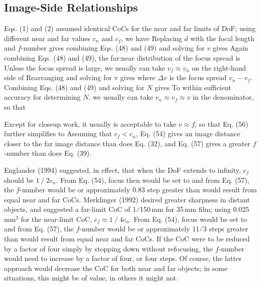 \documentclass[11pt, oneside]{scrartcl}   	%
\begin{document}
\subsection{Image-Side Relationships}

Eqs. (1) and (2) assumed identical CoCs for the near and far limits of DoF; using different near and far values $c_n$ and $c_f$, we have
Replacing $d$ with the focal length and $f$-number gives
combining Eqs. (48) and (49) and solving for $v$ gives
Again combining Eqs. (48) and (49), the far:near distribution of the focus spread is
Unless the focus spread is large, we usually can take $v_f \approx v_n$ on the right-hand side of
Rearranging and solving for v gives
where $Δv$ is the focus spread $v_n - v_f$. Combining Eqs. (48) and (49) and solving for $N$ gives
To within sufficient accuracy for determining $N$, we usually can take $v_n \approx v_f \approx v$ in the denominator, so that

Except for closeup work, it usually is acceptable to take $v \approx f$, so that Eq. (56) further simplifies to
Assuming that $c_f < c_n$, Eq. (54) gives an image distance closer to the far image distance than does Eq. (32), and Eq. (57) gives a greater $f$-number than does Eq. (39).

Englander (1994) suggested, in effect, that when the DoF extends to infinity, $c_f$ should be $1⁄2 c_n$. From Eq. (54), focus then would be set to
and from Eq. (57), the $f$-number would be
or approximately 0.83 step greater than would result from equal near and far CoCs. Merklinger (1992) desired greater sharpness in distant objects, and suggested a far-limit CoC of 1⁄150\,mm for 35\,mm film; using 0.025\,mm$^3$ for the near-limit CoC, $c_f \approx 1⁄4 c_n$. From Eq. (54), focus would be set to
and from Eq. (57), the $f$-number would be
or approximately 11⁄3 steps greater than would result from equal near and far CoCs. If the CoC were to be reduced by a factor of four simply by stopping down without refocusing, the $f$-number would need to increase by a factor of four, or four steps. Of course, the latter approach would decrease the CoC for both near and far objects; in some situations, this might be of value, in others it might not.
\end{document}
